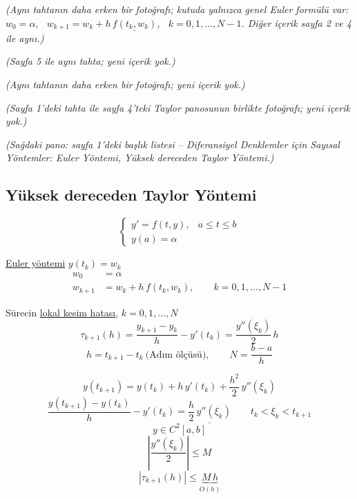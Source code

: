 \documentclass[11pt,a4paper]{article}
\begin{document}
\textit{(Aynı tahtanın daha erken bir fotoğrafı; kutuda yalnızca genel Euler formülü var:
$w_0 = \alpha$, \ $w_{k+1} = w_k + h\,\underline{f(t_k, w_k)}$, \ $k = 0, 1, \dots, N-1$.
Diğer içerik sayfa 2 ve 4 ile aynı.)}

\textit{(Sayfa 5 ile aynı tahta; yeni içerik yok.)}

\textit{(Aynı tahtanın daha erken bir fotoğrafı; yeni içerik yok.)}

\textit{(Sayfa 1'deki tahta ile sayfa 4'teki Taylor panosunun birlikte fotoğrafı; yeni içerik yok.)}

\textit{(Sağdaki pano: sayfa 1'deki başlık listesi -- Diferansiyel Denklemler için Sayısal
Yöntemler: Euler Yöntemi, Yüksek dereceden Taylor Yöntemi.)}

\subsection{Yüksek dereceden Taylor Yöntemi}
\[
  \begin{cases}
    y' = f(t,y), & a \le t \le b \\
    y(a) = \alpha
  \end{cases}
\]

\underline{Euler yöntemi} \qquad $y(t_k) = w_k$
\begin{align*}
  w_0 &= \alpha \\
  w_{k+1} &= w_k + h\,f(t_k, w_k), \qquad k = 0, 1, \dots, N-1
\end{align*}

Sürecin \underline{lokal kesim hatası}, \qquad {} \quad $k = 0, 1, \dots, N$
\[
  \tau_{k+1}(h) = \frac{y_{k+1} - y_k}{h} - y'(t_k) = \frac{y''(\xi_k)}{2}\,h
\]
\[
  \boxed{h = t_{k+1} - t_k} \ \text{(Adım ölçüsü)}, \qquad N = \frac{b-a}{h}
\]

\[
  \boxed{y(t_{k+1}) = y(t_k) + h\,y'(t_k) + \frac{h^2}{2}\,y''(\xi_k)}
\]
\[
  \frac{y(t_{k+1}) - y(t_k)}{h} - y'(t_k) = \underline{\frac{h}{2}\,y''(\xi_k)}
  \qquad t_k < \xi_k < t_{k+1}
\]
\[ y \in C^2[a,b] \]
\[ \left| \frac{y''(\xi_k)}{2} \right| \le M \]
\[ |\tau_{k+1}(h)| \le \underbrace{M\,h}_{\textstyle O(h)} \]

\begin{center}
\end{center}
\end{document}
